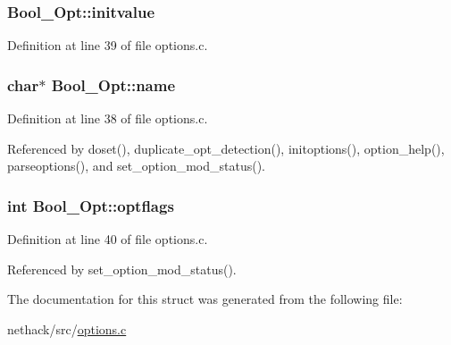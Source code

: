 \hypertarget{structBool__Opt_a99e63ca62d95d0de1b67d023e7fa8a74}{
\subsubsection[{initvalue}]{ Bool\+\_\+\+Opt\+::initvalue}}\label{structBool__Opt_a99e63ca62d95d0de1b67d023e7fa8a74}


Definition at line 39 of file options.\+c.

\hypertarget{structBool__Opt_a162ffbd03a396916a856d9dd1c01c1c6}{
\subsubsection[{name}]{ char$\ast$ Bool\+\_\+\+Opt\+::name}}\label{structBool__Opt_a162ffbd03a396916a856d9dd1c01c1c6}


Definition at line 38 of file options.\+c.



Referenced by doset(), duplicate\+\_\+opt\+\_\+detection(), initoptions(), option\+\_\+help(), parseoptions(), and set\+\_\+option\+\_\+mod\+\_\+status().

\hypertarget{structBool__Opt_aa192b4c0efbe0c27c9dd7390cc1fc3b8}{
\subsubsection[{optflags}]{\setlength{\rightskip}{0pt plus 5cm}int Bool\+\_\+\+Opt\+::optflags}}\label{structBool__Opt_aa192b4c0efbe0c27c9dd7390cc1fc3b8}


Definition at line 40 of file options.\+c.



Referenced by set\+\_\+option\+\_\+mod\+\_\+status().



The documentation for this struct was generated from the following file\+:\begin{DoxyCompactItemize}
\item 
nethack/src/\hyperlink{options_8c}{options.\+c}\end{DoxyCompactItemize}
